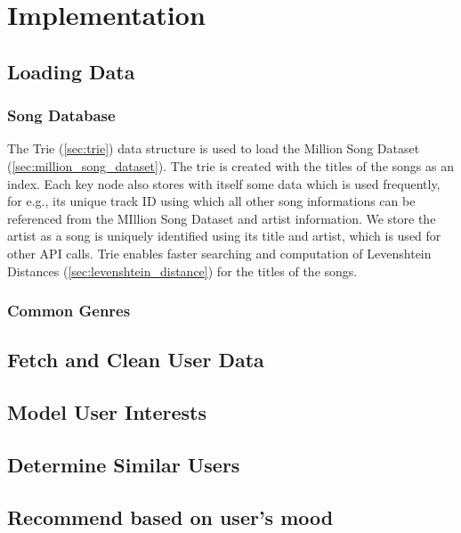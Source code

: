 \chapter{Implementation}

	\section{Loading Data}
	
		\subsection{Song Database}
			The Trie (\ref{sec:trie}) data structure is used to load the Million Song Dataset (\ref{sec:million_song_dataset}). The trie is created with the titles of the songs as an index. Each key node also stores with itself some data which is used frequently, for e.g., its unique track ID using which all other song informations can be referenced from the MIllion Song Dataset and artist information. We store the artist as a song is uniquely identified using its title and artist, which is used for other API calls. Trie enables faster searching and computation of Levenshtein Distances (\ref{sec:levenshtein_distance}) for the titles of the songs.
			
		\subsection{Common Genres}
		
	
	\section{Fetch and Clean User Data}
	
	\section{Model User Interests}
	
	\section{Determine Similar Users}
	
	\section{Recommend based on user's mood}